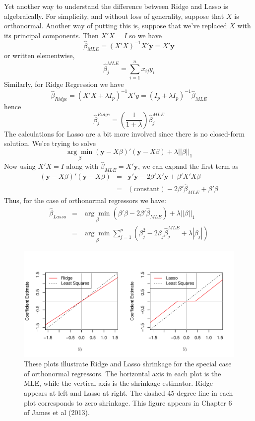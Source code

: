 \documentclass[12pt]{article}
\theoremstyle{definition}
\begin{document}
Yet another way to understand the difference between Ridge and Lasso is algebraically. For simplicity, and without loss of generality, suppose that $X$ is orthonormal. Another way of putting this is, suppose that we've replaced $X$ with its principal components. Then $X'X = I$ so we have
	$$\widehat{\beta}_{MLE} = (X'X)^{-1}X'\textbf{y} = X'\textbf{y}$$
or written elementwise,
	$$\widehat{\beta}^{MLE}_j = \sum_{i=1}^n x_{ij}y_i$$
Similarly, for Ridge Regression we have
	$$\widehat{\beta}_{Ridge} =\left(X'X + \lambda I_p \right)^{-1}X'y = \left(I_p + \lambda I_p \right)^{-1} \widehat{\beta}_{MLE}$$
hence
	$$\widehat{\beta}^{Ridge}_j =  \left(\frac{1}{1+\lambda}\right)\widehat{\beta}^{MLE}_j$$
The calculations for Lasso are a bit more involved since there is no closed-form solution. We're trying to solve
	$$\underset{\beta}{\arg \min} (\mathbf{y}  - X\beta)' (\mathbf{y} - X\beta) + \lambda \left| \left| \beta\right| \right|_1$$
Now using $X'X = I$ along with $\widehat{\beta}_{MLE} = X'\textbf{y}$, we can expand the first term as
	\begin{eqnarray*}
		 (\mathbf{y}  - X\beta)' (\mathbf{y} - X\beta) &=& \mathbf{y}'\mathbf{y} - 2\beta' X' \mathbf{y} + \beta' X'X \beta \\
		 	&=& (\mbox{constant}) - 2\beta' \widehat{\beta}_{MLE} + \beta'\beta
	\end{eqnarray*}
Thus, for the case of orthonormal regressors we have:
\begin{eqnarray*}
	\widehat{\beta}_{Lasso} &=& \underset{\beta}{\arg \min} (\beta'\beta - 2\beta' \widehat{\beta}_{MLE})  +  \lambda \left| \left| \beta\right| \right|_1\\
		&=& \underset{\beta}{\arg \min}  \sum_{j=1}^p \left(\beta_j^2 - 2 \beta_j \widehat{\beta}^{MLE}_j + \lambda\left|\beta_j \right|\right)
\end{eqnarray*}



\begin{figure}
	\centering
	\includegraphics[scale=0.7]{ISLR_ch6_fig10}
	\caption{These plots illustrate Ridge and Lasso shrinkage for the special case of orthonormal regressors. The horizontal axis in each plot is the MLE, while the vertical axis is the shrinkage estimator. Ridge appears at left and Lasso at right. The dashed 45-degree line in each plot corresponds to zero shrinkage. This figure appears in Chapter 6 of James et al (2013).}
	\label{fig:ridge_lasso_shrink}
\end{figure}
\end{document}
